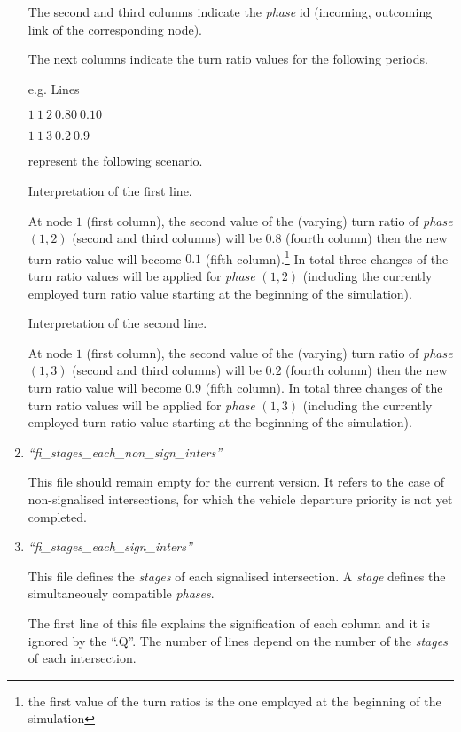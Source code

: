 \documentclass[10pt, conference, compsocconf]{IEEEtran}
\begin{document}
\begin{enumerate}
The second and third  columns indicate the \emph{phase} id (incoming, outcoming link of the corresponding node).

The next columns indicate the  turn ratio values for the following periods. 

e.g. Lines 

$1	\  1	\ 2	\  0.80		\  0.10	 $ 

$1	\  1	\ 3		\  0.2 	\  0.9	 $ 

represent the following scenario.

Interpretation of the first line.

At node $1$ (first column), the second value of the (varying) turn ratio  of \emph{phase} $(1,2)$  (second and third columns) will be  $0.8$ (fourth column) then the new turn ratio value will become $0.1$ (fifth column).\footnote{the first value of the turn ratios is the one employed at the beginning of the simulation}
In total three changes  of the turn ratio values will be applied for \emph{phase} $(1,2)$ (including the currently employed turn ratio value starting at the beginning of the simulation).

Interpretation of the second line.

At node $1$ (first column), the second value of the (varying) turn ratio  of \emph{phase} $(1,3)$  (second and third columns) will be  $0.2$ (fourth column) then the new turn ratio value will become $0.9$ (fifth column).
In total three changes  of the turn ratio values will be applied for \emph{phase} $(1,3)$ (including the currently employed turn ratio value starting at the beginning of the simulation).


\item \emph{``fi\_stages\_each\_non\_sign\_inters''}

This file should remain empty  for the current version. It refers to the case of non-signalised intersections,  for which the vehicle departure priority is not yet completed.



\item \emph{``fi\_stages\_each\_sign\_inters''}

This file defines the \emph{stages} of each signalised intersection. 
A \emph{stage} defines the simultaneously compatible \emph{phases}. 

The first line of this file explains the signification of each column  and it is ignored by the ``.Q''.
The number of lines depend on the number of the  \emph{stages} of each intersection.


\end{enumerate}
\end{document}
